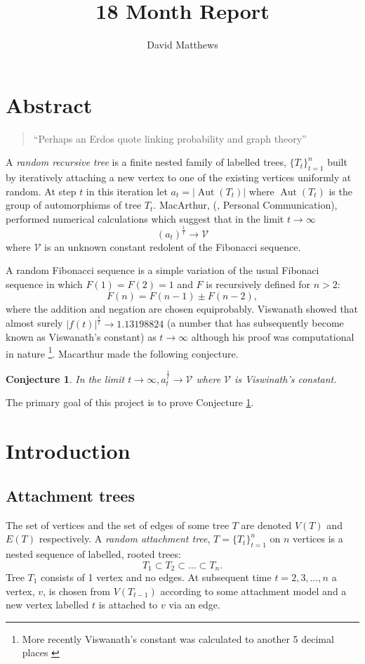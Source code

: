 \documentclass[oneside]{book} %
\title{18 Month Report}
\author{David Matthews}
\newtheorem{con}[thm]{Conjecture}
\theoremstyle{definition}
\numberwithin{equation}{section}
\DeclareMathOperator{\Aut}{Aut} %
\begin{document}
\tableofcontents
\chapter*{\centering Abstract}\label{sec:intro}
\begin{quotation}
 ``Perhaps an Erdos quote linking probability and graph theory'' 
\end{quotation}
A \emph{random recursive tree} is a finite nested family of labelled trees, $\{T_t\}_{t=1}^{n}$ built by iteratively attaching
a new vertex to one of the existing vertices uniformly at random. At step $t$ in this iteration let
$a_t = \lvert \Aut(T_t) \rvert$ where $\Aut(T_t)$ is the group of automorphisms of tree $T_t$.  MacArthur, (\cite{Bens}, Personal Communication), performed numerical calculations which suggest that in the limit $t \rightarrow \infty$
\[(a_t)^\frac{1}{t} \rightarrow \mathcal{V} \]
where $\mathcal{V}$ is an unknown constant redolent of the Fibonacci sequence.

A random Fibonacci sequence is a simple variation of the usual Fibonaci sequence in which $F(1) = F(2) = 1$ and $F$ is recursively defined for $n>2$:
\[F(n) = F(n-1) \pm F(n-2), \]
where the addition and negation are chosen equiprobably.  Viswanath \cite{Viswanath} showed that almost surely 
$|f(t)|^{\frac{1}{t}} \rightarrow 1.13198824 $ (a number that has subsequently become known as Viswanath's constant) as 
$t\rightarrow\infty$ although his proof was computational in nature \footnote{More recently Viswanath's constant was calculated to another 5 decimal places \cite{oli}}.   Macarthur made the following conjecture.

\begin{con}\label{conj:1}
In the limit $t \rightarrow \infty, a_t^\frac{1}{t} \rightarrow \mathcal{V} $ where $\mathcal{V}$ is Viswinath's constant.  
\end{con}

The primary goal of this project is to prove Conjecture \ref{conj:1}.
   
\chapter{Introduction}\label{sec:background}
\section{Attachment trees}\label{sec:att}
The set of vertices and the set of edges of some tree $T$ are denoted $V(T)$ and $E(T)$ respectively.  
A \emph{random attachment tree}, $T = \{T_t\}_{t=1}^n$ on $n$ vertices is a nested sequence of  labelled, rooted trees:
\[T_{1} \subset T_{2} \subset \dots \subset T_{n}.\]
Tree $T_{1}$ consists of 1 vertex and no edges. At subsequent time $t = 2,3,\dots,n$ a vertex, $v$, is chosen from 
$V(T_{t-1})$ according to some attachment model and a new vertex labelled $t$ is attached to $v$ via an edge. 
\end{document}
